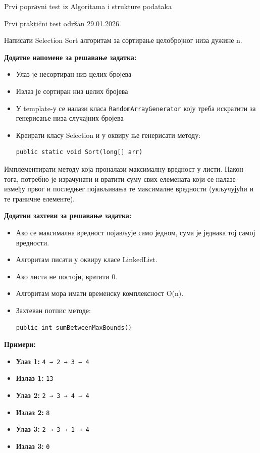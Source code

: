 
Prvi poprаvni test iz Algoritama i strukture podataka

Prvi praktični test održan 29.01.2026.

Написати Selection Sort алгоритам за сортирање целобројног низа дужине n.

\textbf{Додатне напомене за решавање задатка:}
\begin{itemize}
	\item Улаз је несортиран низ целих бројева
	\item Излаз је сортиран низ целих бројева
	\item У template-у се налази класа \texttt{RandomArrayGenerator} коју треба искратити за генерисање низа случајних бројева
	\item Креирати класу Selection и у оквиру ње генерисати методу:
	\begin{Verbatim}[fontsize=\small]
public static void Sort(long[] arr)
	\end{Verbatim}
\end{itemize}

Имплементирати методу која проналази максималну вредност у листи. Након тога, потребно је израчунати и вратити суму свих елемената који се налазе између првог и последњег појављивања те максималне вредности (укључујући и те граничне елементе).

\textbf{Додатни захтеви за решавање задатка:}
\begin{itemize}
	\item Ако се максимална вредност појављује само једном, сума је једнака тој самој вредности.
	\item Алгоритам писати у оквиру класе LinkedList.
	\item Ако листа не постоји, вратити 0.
	\item Алгоритам мора имати временску комплексност O(n).
	\item Захтеван потпис методе:
	\begin{Verbatim}[fontsize=\small]
public int sumBetweenMaxBounds()
	\end{Verbatim}
\end{itemize}

\textbf{Примери:}
\begin{itemize}
	\item \textbf{Улаз 1:} \texttt{4 → 2 → 3 → 4}
	\item \textbf{Излаз 1:} \texttt{13}
	\item \textbf{Улаз 2:} \texttt{2 → 3 → 4 → 4}
	\item \textbf{Излаз 2:} \texttt{8}
	\item \textbf{Улаз 3:} \texttt{2 → 3 → 1 → 4}
	\item \textbf{Излаз 3:} \texttt{0}
\end{itemize}

